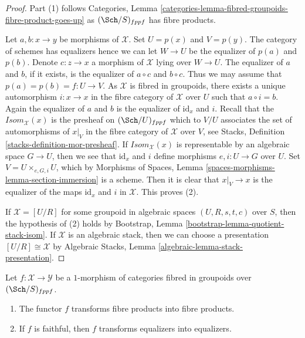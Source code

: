 \begin{proof}
Part (1) follows
Categories, Lemma \ref{categories-lemma-fibred-groupoids-fibre-product-goes-up}
as $(\Sch/S)_{fppf}$ has fibre products.

\medskip\noindent
Let $a, b : x \to y$ be morphisms of $\mathcal{X}$.
Set $U = p(x)$ and $V = p(y)$. The category of schemes has equalizers
hence we can let $W \to U$ be the equalizer of $p(a)$ and $p(b)$.
Denote $c : z \to x$ a morphism of $\mathcal{X}$ lying over $W \to U$.
The equalizer of $a$ and $b$, if it exists, is the equalizer of $a \circ c$
and $b \circ c$. Thus we may assume that $p(a) = p(b) = f : U \to V$.
As $\mathcal{X}$ is fibred in groupoids, there exists a unique automorphism
$i : x \to x$ in the fibre category of $\mathcal{X}$ over $U$ such that
$a \circ i = b$. Again the equalizer of $a$ and $b$ is the equalizer
of $\text{id}_x$ and $i$. Recall that the $\mathit{Isom}_\mathcal{X}(x)$
is the presheaf on $(\Sch/U)_{fppf}$ which to
$V/U$ associates the set of automorphisms of $x|_V$ in the fibre category
of $\mathcal{X}$ over $V$, see
Stacks, Definition \ref{stacks-definition-mor-presheaf}.
If $\mathit{Isom}_\mathcal{X}(x)$ is representable by an algebraic space
$G \to U$, then we see that $\text{id}_x$ and $i$ define morphisms
$e, i : U \to G$ over $U$. Set $V = U \times_{e, G, i} U$, which by
Morphisms of Spaces, Lemma \ref{spaces-morphisms-lemma-section-immersion}
is a scheme. Then it is clear that $x|_V \to x$ is the equalizer of
the maps $\text{id}_x$ and $i$ in $\mathcal{X}$.
This proves (2).

\medskip\noindent
If $\mathcal{X} = [U/R]$ for some groupoid in algebraic spaces
$(U, R, s, t, c)$ over $S$, then the hypothesis of (2) holds by
Bootstrap, Lemma \ref{bootstrap-lemma-quotient-stack-isom}.
If $\mathcal{X}$ is an algebraic stack, then we can choose a
presentation $[U/R] \cong \mathcal{X}$ by
Algebraic Stacks, Lemma \ref{algebraic-lemma-stack-presentation}.
\end{proof}

\begin{lemma}
\label{lemma-fibre-products-morphism}
Let $f : \mathcal{X} \to \mathcal{Y}$ be a $1$-morphism of categories
fibred in groupoids over $(\Sch/S)_{fppf}$.
\begin{enumerate}
\item The functor $f$ transforms fibre products into fibre products.
\item If $f$ is faithful, then $f$ transforms equalizers into equalizers.
\end{enumerate}
\end{lemma}

